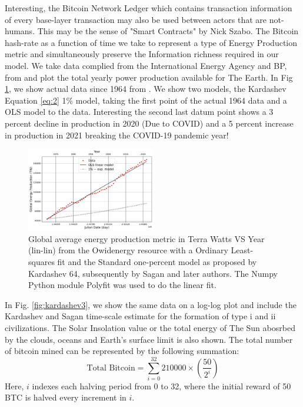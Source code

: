\documentclass[final,5p,times,twocolumn,authoryear]{elsarticle}
\begin{document}
Interesting, the Bitcoin Network Ledger which contains transaction information of every base-layer transaction may also be used between actors that are not-humans. This may be the sense of "Smart Contracts" by Nick Szabo. The Bitcoin hash-rate as a function of time we take to represent a type of Energy Production metric and simultaneously preserve the Information richness required in our model. We take data complied from the International Energy Agency and BP, from \cite{owidenergy} and plot the total yearly power production available for The Earth. In Fig \ref{fig:kardashev1}, we show actual data since 1964 from \cite{owidenergy}. We show two models, the Kardashev Equation \ref{eq:2} 1\% model, taking the first point of the actual 1964 data and a OLS model to the data. Interesting the second last datum point shows a 3 percent decline in production in 2020 (Due to COVID) and a 5 percent increase in production in 2021 breaking the COVID-19 pandemic year!
\begin{figure}
    \centering
    \includegraphics[width=0.5\textwidth]{figs/fig1_kar2ff.jpg}
    \caption{Global average energy production metric in Terra Watts VS Year (lin-lin) from the Owidenergy resource with a Ordinary Least-squares fit and the Standard one-percent model as proposed  by Kardashev 64, subsequently by Sagan and later authors. The Numpy Python module Polyfit was used to do the linear fit.}
    \label{fig:kardashev1}

\end{figure}

In Fig. \ref{fig:kardashev3}, we show the same data on a log-log plot and include the Kardashev and Sagan time-scale estimate for the formation of type i and ii civilizations. The Solar Insolation value or the total energy of The Sun abosrbed by the clouds, oceans and Earth's surface limit is also shown. %
The total number of bitcoin mined can be represented by the following summation:
\[
\textrm{Total Bitcoin} = \sum_{i=0}^{32} 210000 \times \left(\frac{50}{2^i}\right)
\]
Here, \( i \) indexes each halving period from 0 to 32, where the initial reward of 50 BTC is halved every increment in \( i \).
\end{document}
